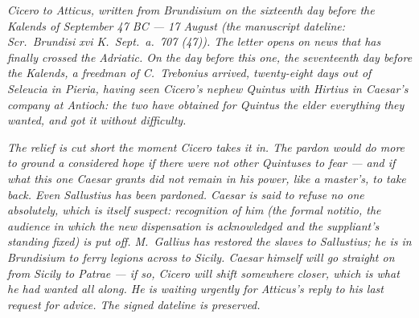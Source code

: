
\textit{Cicero to Atticus, written from Brundisium on
the sixteenth day before the Kalends of September 47 BC
--- 17 August (the manuscript dateline: \textit{Scr.\
Brundisi xvi K.\ Sept.\ a.\ 707 (47)}). The letter
opens on news that has finally crossed the Adriatic.
On the day before this one, the seventeenth day before
the Kalends, a freedman of C.\ Trebonius arrived,
twenty-eight days out of Seleucia in Pieria, having
seen Cicero's nephew Quintus with Hirtius in Caesar's
company at Antioch: the two have obtained for Quintus
the elder everything they wanted, and got it without
difficulty.}

\textit{The relief is cut short the moment Cicero
takes it in. The pardon would do more to ground a
considered hope if there were not other Quintuses to
fear --- and if what this one Caesar grants did not
remain in his power, like a master's, to take back.
Even Sallustius has been pardoned. Caesar is said to
refuse no one absolutely, which is itself suspect:
recognition of him (the formal notitio, the audience
in which the new dispensation is acknowledged and the
suppliant's standing fixed) is put off. M.\ Gallius
has restored the slaves to Sallustius; he is in
Brundisium to ferry legions across to Sicily. Caesar
himself will go straight on from Sicily to Patrae ---
if so, Cicero will shift somewhere closer, which is
what he had wanted all along. He is waiting urgently
for Atticus's reply to his last request for advice.
The signed dateline is preserved.}
